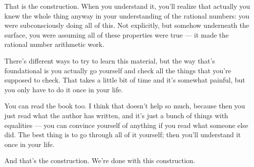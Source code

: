\begin{speech}[01:06:49 - 01:08:00]
That is the construction. When you understand it, you'll realize that actually you knew the whole thing anyway in your understanding of the rational numbers: you were subconsciously doing all of this. Not explicitly, but somehow underneath the surface, you were assuming all of these properties were true --- it made the rational number arithmetic work.

There's different ways to try to learn this material, but the way that's foundational is you actually go yourself and check all the things that you're supposed to check. That takes a little bit of time and it's somewhat painful, but you only have to do it once in your life.

You can read the book too. I think that doesn't help so much, because then you just read what the author has written, and it's just a bunch of things with equalities --- you can convince yourself of anything if you read what someone else did. The best thing is to go through all of it yourself; then you'll understand it once in your life.

And that's the construction. We're done with this construction.
\end{speech}

